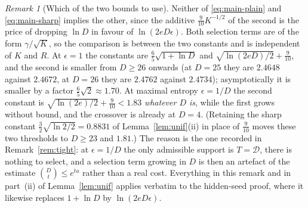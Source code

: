 \documentclass[11pt,a4paper]{article}
\theoremstyle{plain}
\theoremstyle{definition}
\theoremstyle{remark}
\newtheorem{remark}{Remark}
\newcommand{\calD}{\mathcal{D}}
\begin{document}
\begin{remark}[Which of the two bounds to use]\label{rem:refine}
Neither of \eqref{eq:main-plain} and \eqref{eq:main-sharp} implies the other, since the additive
$\tfrac{9}{10}K^{-1/2}$ of the second is the price of dropping $\ln D$ in favour of
$\ln(2eD\epsilon)$. Both selection terms are of the form $\gamma/\sqrt K$, so the comparison is
between the two constants and is independent of $K$ and $R$. At $\epsilon = 1$ the constants are
$\tfrac65\sqrt{1+\ln D}$ and $\sqrt{\ln(2eD)/2} + \tfrac9{10}$, and the second is smaller from
$D \ge 26$ onwards (at $D = 25$ they are $2.4648$ against $2.4672$, at $D = 26$ they are $2.4762$
against $2.4734$); asymptotically it is smaller by a factor $\tfrac65\sqrt2 \approx 1.70$. At
maximal entropy $\epsilon = 1/D$ the second constant is $\sqrt{\ln(2e)/2} + \tfrac9{10} < 1.83$
\emph{whatever $D$ is}, while the first grows without bound, and the crossover is already at
$D = 4$. (Retaining the sharp constant $\tfrac32\sqrt{\ln2/2} = 0.8831$ of
Lemma~\ref{lem:unif}(ii) in place of $\tfrac9{10}$ moves these two thresholds to $D \ge 23$ and
$1.81$.) The reason is the one recorded in Remark~\ref{rem:tight}: at $\epsilon = 1/D$ the only
admissible support is $T = \calD$, there is nothing to select, and a selection term growing in $D$
is then an artefact of the estimate $\binom{D}{t} \le e^{ta}$ rather than a real cost. Everything
in this remark and in part~(ii) of Lemma~\ref{lem:unif} applies verbatim to the hidden-seed proof,
where it likewise replaces $1+\ln D$ by $\ln(2eD\epsilon)$.
\end{remark}
\end{document}
